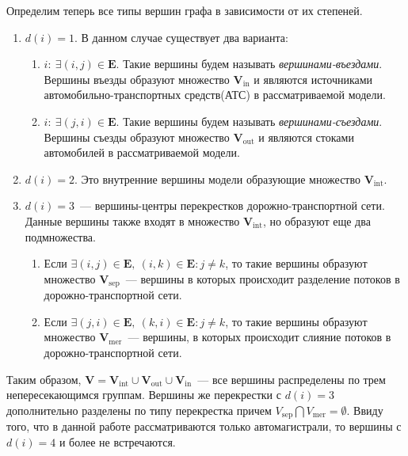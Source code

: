 Определим теперь все типы вершин графа в зависимости от их степеней.
\begin{enumerate}
  \item $d(i) = 1$. В данном случае существует два варианта:
  \begin{enumerate}
    \item $i:\ \exists (i,j)\in \mathbf{E}$. Такие вершины будем называть \emph{вершинами-въездами}. Вершины въезды образуют множество $\mathbf{V}_\text{in}$ и являются источниками автомобильно-транспортных средств(АТС) в рассматриваемой модели.
    \item $i:\ \exists (j,i)\in \mathbf{E}$. Такие вершины будем называть \emph{вершинами-съездами}. Вершины съезды образуют множество $\mathbf{V}_\text{out}$ и являются стоками автомобилей в рассматриваемой модели.
  \end{enumerate}
  \item $d(i) = 2$. Это внутренние вершины модели образующие множество $\mathbf{V}_\text{int}$.
  \item $d(i) = 3$~--- вершины-центры перекрестков дорожно-транспортной сети. Данные вершины также входят в множество $\mathbf{V}_\text{int}$, но образуют еще два подмножества.
  \begin{enumerate}
    \item Если $\exists (i, j) \in \mathbf{E},\ (i, k) \in \mathbf{E} : j\neq k $, то такие вершины образуют множество $\mathbf{V}_\text{sep}$~--- вершины в которых происходит разделение потоков в дорожно-транспортной сети.
    \item Если $\exists (j, i) \in \mathbf{E},\ (k, i) \in \mathbf{E} : j\neq k $, то такие вершины образуют множество $\mathbf{V}_\text{mer}$~--- вершины, в которых происходит слияние потоков в дорожно-транспортной сети.
  \end{enumerate}
\end{enumerate}
Таким образом, $\mathbf{V} = \mathbf{V}_\text{int} \cup \mathbf{V}_\text{out} \cup \mathbf{V}_\text{in}$~--- все вершины распределены по трем непересекающимся группам. Вершины же перекрестки с $d(i) = 3$ дополнительно разделены по типу перекрестка причем $V_\text{sep}\bigcap V_\text{mer} = \emptyset$. Ввиду того, что в данной работе рассматриваются только автомагистрали, то вершины с $d(i) = 4$ и более не встречаются.

